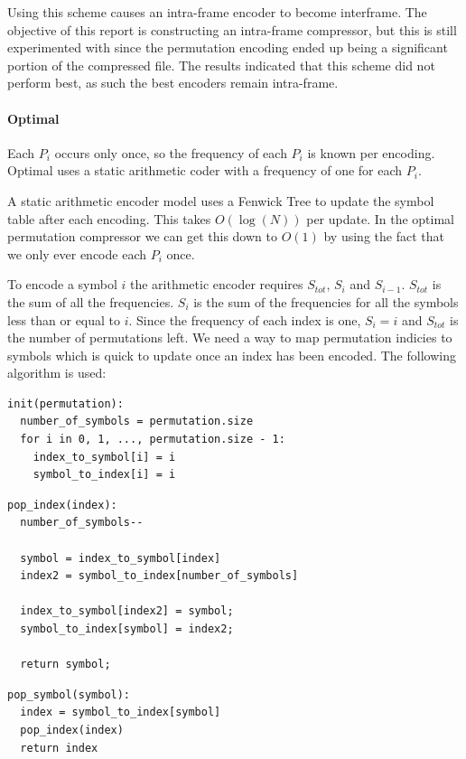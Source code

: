 \documentclass[a4paper]{report}
\begin{document}
Using this scheme causes an intra-frame encoder to become interframe. The
objective of this report is constructing an intra-frame compressor, but this
is still experimented with since the permutation encoding ended up being a
significant portion of the compressed file. The results indicated that this
scheme did not perform best, as such the best encoders remain intra-frame.

\paragraph{Optimal}
Each $P_i$ occurs only once, so the frequency of each $P_i$ is known per
encoding. Optimal uses a static arithmetic coder with a frequency of one for
each $P_i$.

A static arithmetic encoder model uses a Fenwick Tree \citep{fenwick1994new}
to update the symbol table after each encoding. This takes $O(\log(N))$ per
update. In the optimal permutation compressor we can get this down to $O(1)$
by using the fact that we only ever encode each $P_i$ once.

To encode a symbol $i$ the arithmetic encoder requires $S_{tot}$, $S_i$ and
$S_{i-1}$. $S_{tot}$ is the sum of all the frequencies. $S_i$ is the sum of
the frequencies for all the symbols less than or equal to $i$. Since the
frequency of each index is one, $S_i = i$ and $S_{tot}$ is the number of
permutations left. We need a way to map permutation indicies to symbols which
is quick to update once an index has been encoded. The following algorithm is
used:

\begin{verbatim}
init(permutation):
  number_of_symbols = permutation.size
  for i in 0, 1, ..., permutation.size - 1:
    index_to_symbol[i] = i
    symbol_to_index[i] = i
\end{verbatim}

\begin{verbatim}
pop_index(index):
  number_of_symbols--

  symbol = index_to_symbol[index]
  index2 = symbol_to_index[number_of_symbols]

  index_to_symbol[index2] = symbol;
  symbol_to_index[symbol] = index2;

  return symbol;
\end{verbatim}

\begin{verbatim}
pop_symbol(symbol):
  index = symbol_to_index[symbol]
  pop_index(index)
  return index
\end{verbatim}
\end{document}
